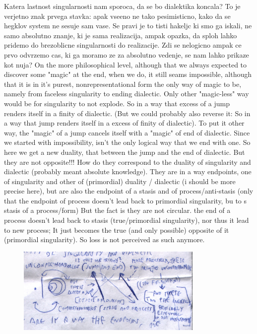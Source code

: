 \documentclass[10pt]{book}
\begin{document}
Katera lastnost singularnosti nam sporoca, da se bo dialektika koncala? 
To je verjetno znak prvega stavka: apak vseeno ne tako pesimisticno, kako da se hegklov system ne sesuje sam vase. Se pravi je to tisti hakeljc ki smo ga iskali, ne samo absolutno znanje, ki je sama realizacija, ampak opazka, da sploh lahko pridemo do brezoblicne singularnosti do realizacije. Zdi se nelogicno ampak ce prvo odvrzemo cas, ki ga moramo ze za absolutno vedenje, se nam lahko prikaze kot nuja? On the more philosophical level, although that we always expected to discover some "magic" at the end, when we do, it still seams impossible, although that it is in it's purest, nonrepresentational form the only way of magic to be, namely from faceless singularity to ending dialectic. Only other "magic-less" way would be for singularity to not explode. So in a way that excess of a jump renders itself in a finity of dialectic. (But we could probably also reverse it: So in a way that jump renders itself in a excess of finity of dialectic). To put it other way, the "magic" of a jump cancels itself with a "magic" of end of dialectic. Since we started with impossibility, isn't the only logical way that we end with one. 
So here we get a new duality, that between the jump and the end of dialectic. But they are not opposite!!! How do they correspond to the duality of singularity and dialectic (probably meant absolute knowledge). They are in a way endpoints, one of singularity and other of (primordial) duality / dialectic (i should be more precise here), but are also the endpoint of a stasis and of process/anti-stasis (only that the endpoint of process doesn't lead back to primordial singularity, bu to s stasis of a process/form) But the fact is they are not circular. the end of a process doesn't lead back to stasis (true/primordial singularity), nor thus it lead to new process; It just becomes the true (and only possible) opposite of it (primordial singularity). So loss is not perceived as such anymore. 

\begin{figure}[ht!]
\centering
\includegraphics[width=90mm]{scan02.jpg}
\label{overflow}
\end{figure}
\end{document}
